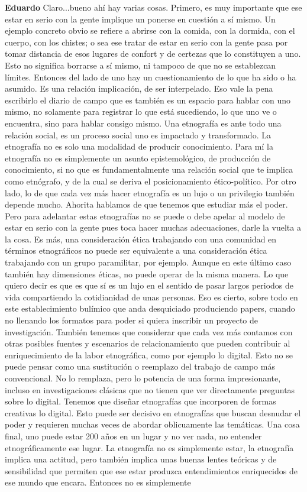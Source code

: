 \documentclass[
  spanish,
  11pt,
  a4paper,
]{scrbook}
\newenvironment{transcripcion}{
    \begin{list}{}{
        \setlength{\leftmargin}{1.5em}  %
        \setlength{\rightmargin}{0em}
        \setlength{\itemsep}{0.2em}     %
        \setlength{\parsep}{0.0em}
        \setlength{\listparindent}{0pt}
    }
}{
    \end{list}
}
\newcommand{\personaje}[1]{\textbf{#1}\quad}
\begin{document}
\begin{transcripcion}
\item \personaje{Eduardo} Claro...bueno ahí hay varias cosas. Primero, es muy importante que ese estar en serio con la gente implique un ponerse en cuestión a sí mismo. Un ejemplo concreto obvio se refiere a abrirse con la comida, con la dormida, con el cuerpo, con los chistes; o sea ese tratar de estar en serio con la gente pasa por tomar distancia de esos lugares de confort y de certezas que lo constituyen a uno. Esto no significa borrarse a sí mismo, ni tampoco de que no se establezcan límites. Entonces del lado de uno hay un cuestionamiento de lo que ha sido o ha asumido. Es una relación implicación, de ser interpelado. Eso vale la pena escribirlo el diario de campo que es también es un espacio para hablar con uno mismo, no solamente para registrar lo que está sucediendo, lo que uno ve o encuentra, sino para hablar consigo mismo. Una etnografía es ante todo una relación social, es un proceso social uno es impactado y transformado. La etnografía no es solo una modalidad de producir conocimiento. Para mí la etnografía no es simplemente un asunto epistemológico, de producción de conocimiento, si no que es fundamentalmente una relación social que te implica como etnógrafo, y de la cual se deriva el posicionamiento ético-político. Por otro lado, lo de que cada vez más hacer etnografía es un lujo o un privilegio también depende mucho. Ahorita hablamos de que tenemos que estudiar más el poder. Pero para adelantar estas etnografías no se puede o debe apelar al modelo de estar en serio con la gente pues toca hacer muchas adecuaciones, darle la vuelta a la cosa. Es más, una consideración ética trabajando con una comunidad en términos etnográficos no puede ser equivalente a una consideración ética trabajando con un grupo paramilitar, por ejemplo. Aunque en este último caso también hay dimensiones éticas, no puede operar de la misma manera. Lo que quiero decir es que es que sí es un lujo en el sentido de pasar largos periodos de vida compartiendo la cotidianidad de unas personas. Eso es cierto, sobre todo en este establecimiento bulímico que anda desquiciado produciendo papers, cuando no llenando los formatos para poder si quiera inscribir un proyecto de investigación. También tenemos que considerar que cada vez más contamos con otras posibles fuentes y escenarios de relacionamiento que pueden contribuir al enriquecimiento de la labor etnográfica, como por ejemplo lo digital. Esto no se puede pensar como una sustitución o reemplazo del trabajo de campo más convencional. No lo remplaza, pero lo potencia de una forma impresionante, incluso en investigaciones clásicas que no tienen que ver directamente preguntas sobre lo digital. Tenemos que diseñar etnografías que incorporen de formas creativas lo digital. Esto puede ser decisivo en etnografías que buscan desnudar el poder y requieren muchas veces de abordar oblicuamente las temáticas. Una cosa final, uno puede estar 200 años en un lugar y no ver nada, no entender etnográficamente ese lugar. La etnografía no es simplemente estar, la etnografía implica una actitud, pero también implica unas buenas lentes teóricas y de sensibilidad que permiten que ese estar produzca entendimientos enriquecidos de ese mundo que encara. Entonces no es simplemente 
\end{transcripcion}
\end{document}
